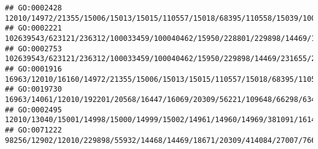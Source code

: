 \documentclass[
]{article}
\begin{document}
\begin{verbatim}
## GO:0002428                                                                                                                                                                                                                                                                                                             12010/14972/21355/15006/15013/15015/110557/15018/68395/110558/15039/100529082/15024/667977/14990
## GO:0002221                                                                                                                                                                       102639543/623121/236312/100033459/100040462/15950/228801/229898/14469/100061/231655/246727/23961/23960/246730/414084/20128/54123/234311/81897/327957/637515/80861/382551/58185/16364/54483/15511/224762/224840/12475/60533/71398/12229
## GO:0002753                                                                                                                                                                                                              102639543/623121/236312/100033459/100040462/15950/229898/14469/231655/246727/23961/23960/246730/20128/54123/234311/81897/327957/637515/80861/382551/58185/54483/15511/224762/224840/71398/12229
## GO:0001916                                                                                                                                                                                                                                                                                                 16963/12010/16160/14972/21355/15006/15013/15015/110557/15018/68395/110558/15039/100529082/15024/667977/14990
## GO:0019730                                                                                                                                                                                                                 16963/14061/12010/192201/20568/16447/16069/20309/56221/109648/66298/634825/382059/100041759/13237/13239/626682/626708/100041952/503491/20299/20295/20306/20307/20304/20303/66107/56838/78416
## GO:0002495                                                                                                                                                                                                                                                                                                                                     12010/13040/15001/14998/15000/14999/15002/14961/14960/14969/381091/16149
## GO:0071222                                                                                                                                                          98256/12902/12010/229898/55932/14468/14469/18671/20309/414084/27007/76681/434219/20128/209387/66298/634825/382059/100041759/13237/13239/626682/626708/100041952/503491/17394/81897/16160/327957/18126/22169/17079/100503545/12475/12511/60533/58205

\end{verbatim}
\end{document}
